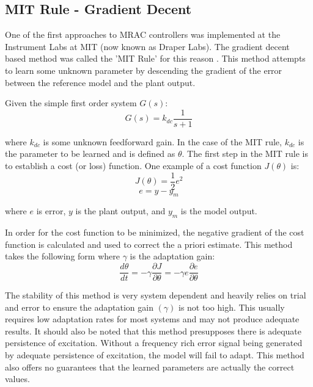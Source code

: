 \subsection{MIT Rule - Gradient Decent}
One of the first approaches to \ac{MRAC} controllers was implemented at the Instrument Labs at MIT (now known as Draper Labs).  The gradient decent based method was called the 'MIT Rule' for this reason \cite{aastrom2013adaptive}.  This method attempts to learn some unknown parameter by descending the gradient of the error between the reference model and the plant output.

Given the simple first order system $G(s)$:
\begin{equation}
G(s) = k_{dc}\frac{1}{s+1}
\end{equation}

where $k_{dc}$ is some unknown feedforward gain.  In the case of the MIT rule, $k_{dc}$ is the parameter to be learned and is defined as $\theta$.  The first step in the MIT rule is to establish a cost (or loss) function.  One example of a cost function $J(\theta)$ is:
\begin{equation}
J(\theta) = \frac{1}{2}e^2
\end{equation}
\begin{equation}
e=y-y_m
\end{equation}

where $e$ is error, $y$ is the plant output, and $y_m$ is the model output.

In order for the cost function to be minimized, the negative gradient of the cost function is calculated and used to correct the a priori estimate.  This method takes the following form where $\gamma$ is the adaptation gain:
\begin{equation}
\frac{d\theta}{dt}=-\gamma \frac{\partial{J}}{\partial{\theta}} =-\gamma e\frac{\partial{e}}{\partial{\theta}}
\end{equation}

The stability of this method is very system dependent and heavily relies on trial and error to ensure the adaptation gain $(\gamma)$ is not too high.  This usually requires low adaptation rates for most systems and may not produce adequate results.  It should also be noted that this method presupposes there is adequate persistence of excitation.  Without a frequency rich error signal being generated by adequate persistence of excitation, the model will fail to adapt.  This method also offers no guarantees that the learned parameters are actually the correct values.

